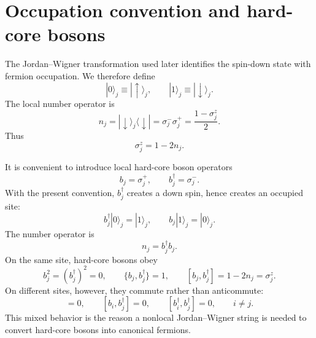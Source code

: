 \section{Occupation convention and hard-core bosons}

The Jordan--Wigner transformation used later identifies the spin-down state with
fermion occupation. We therefore define
\begin{equation}
\label{eq:spin-occupation-convention}
    |0\rangle_j\equiv |\uparrow\rangle_j,
    \qquad
    |1\rangle_j\equiv |\downarrow\rangle_j.
\end{equation}
The local number operator is
\begin{equation}
\label{eq:number-spin-convention}
    n_j
    =
    |\downarrow\rangle_j\langle\downarrow|
    =
    \sigma_j^-\sigma_j^+
    =
    \frac{1-\sigma_j^z}{2}.
\end{equation}
Thus
\begin{equation}
\label{eq:sigmaz-number-convention}
    \sigma_j^z=1-2n_j.
\end{equation}

It is convenient to introduce local hard-core boson operators
\begin{equation}
\label{eq:hard-core-boson-convention}
    b_j=\sigma_j^+,
    \qquad
    b_j^\dagger=\sigma_j^-.
\end{equation}
With the present convention, $b_j^\dagger$ creates a down spin, hence creates an
occupied site:
\begin{equation}
    b_j^\dagger |0\rangle_j=|1\rangle_j,
    \qquad
    b_j |1\rangle_j=|0\rangle_j.
\end{equation}
The number operator is
\begin{equation}
    n_j=b_j^\dagger b_j.
\end{equation}
On the same site, hard-core bosons obey
\begin{equation}
    b_j^2=(b_j^\dagger)^2=0,
    \qquad
    \{b_j,b_j^\dagger\}=1,
    \qquad
    [b_j,b_j^\dagger]=1-2n_j=\sigma_j^z.
\end{equation}
On different sites, however, they commute rather than anticommute:
\begin{equation}
    [b_i,b_j]=0,
    \qquad
    [b_i,b_j^\dagger]=0,
    \qquad
    [b_i^\dagger,b_j^\dagger]=0,
    \qquad
    i\neq j.
\end{equation}
This mixed behavior is the reason a nonlocal Jordan--Wigner string is needed to
convert hard-core bosons into canonical fermions.

